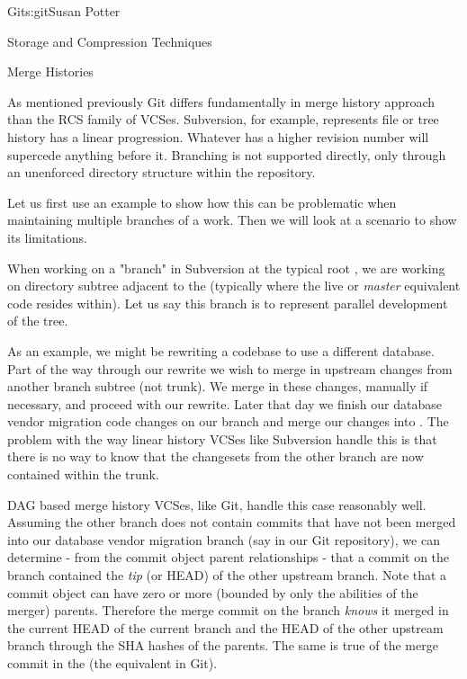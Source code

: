 \begin{aosachapter}{Git}{s:git}{Susan Potter}
\begin{aosasect1}{Storage and Compression Techniques}
\end{aosasect1}

\begin{aosasect1}{Merge Histories}

As mentioned previously Git differs fundamentally in merge history approach
than the RCS family of VCSes. Subversion, for example, represents
file or tree history has a linear progression. Whatever has a higher revision
number will supercede anything before it. Branching is not supported directly,
only through an unenforced directory structure within the repository.

Let us first use an example to show how this can be problematic when
maintaining multiple branches of a work. Then we will look at a scenario to
show its limitations.

When working on a "branch" in Subversion at the typical root
, we are working on directory subtree adjacent to
the  (typically where the live or \emph{master} equivalent code
resides within). Let us say this branch is to represent parallel development
of the  tree.

As an example,
we might be rewriting a codebase to use a different database. Part of the
way through our rewrite we wish to merge in upstream changes from another
branch subtree (not trunk). We merge in these changes, manually if necessary,
and proceed with our rewrite. Later that day we finish our database vendor
migration code changes on our  branch and merge
our changes into . The problem with the way linear history VCSes
like Subversion handle this is that there is no way to know that the
changesets from the other branch are now contained within the trunk.

DAG based merge history VCSes, like Git, handle this case reasonably well.
Assuming the other branch does not contain commits that have not been merged
into our database vendor migration branch (say  in our
Git repository), we can determine - from the commit object parent
relationships - that a commit on the  branch contained
the \emph{tip} (or HEAD) of the other upstream branch. Note that a commit
object can have zero or more (bounded by only the abilities of the merger)
parents. Therefore the merge commit on the  branch
\emph{knows} it merged in the current HEAD of the current branch and the
HEAD of the other upstream branch through the SHA hashes of the parents.
The same is true of the merge commit in the  (the 
equivalent in Git).


\end{aosasect1}
\end{aosachapter}
